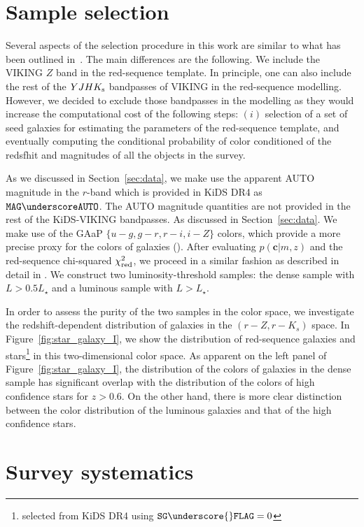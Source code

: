 \documentclass[fleqn,usenatbib,useAMS]{mnras}
\begin{document}
\section{Sample selection}\label{sec:selection}

Several aspects of the selection procedure in this work are similar to what has been outlined  in~\citet{vakili2019}.  The main differences are the following. We include the VIKING $Z$ band in the red-sequence template. In principle, one can also include the rest of the $YJHK_{\rm s}$ bandpasses of VIKING in the red-sequence modelling. However, we decided to exclude those bandpasses in the modelling as they would increase the computational cost of the following steps: $(i)$ selection of a set of seed galaxies for estimating the parameters of the red-sequence template, and eventually computing the conditional probability of color conditioned of the redsfhit and magnitudes of all the objects in the survey. 

As we discussed in Section~\ref{sec:data}, we make use the apparent AUTO magnitude in the $r$-band which is provided in KiDS DR4  as $\mathtt{MAG \underscore AUTO}$. The AUTO magnitude quantities are not provided in the rest of the KiDS-VIKING bandpasses. As discussed in Section~\ref{sec:data}. We make use of the GAaP $\{u-g,g-r,r-i,i-Z\}$ colors, which provide a more precise proxy for the colors of galaxies (\citealt{kuijken2019}). After evaluating $p(\boldsymbol{c}|m,z)$ and the red-sequence chi-squared $\chi^{2}_{\rm red}$, we proceed in a similar fashion as described in detail in \citet{rozo2016, vakili2019}. We construct two luminosity-threshold samples: the dense sample with $L>0.5 L_{\star}$ and a luminous sample with $L>L_{\star}$. 

In order to assess the purity of the two samples in the color space, we investigate the redshift-dependent distribution of galaxies in the $(r-Z, r-K_{s})$ space. In Figure~\ref{fig:star_galaxy_I}, we show the distribution of red-sequence galaxies and stars\footnote{selected from KiDS DR4 using $\mathtt{SG\underscore{}FLAG}= 0$} in this two-dimensional color space.  As apparent on the left panel of Figure~\ref{fig:star_galaxy_I}, the distribution of the colors of galaxies in the dense sample has significant overlap with the distribution of the colors of high confidence stars for $z>0.6$. On the other hand, there is more clear distinction between the color distribution of the luminous galaxies and that of the high confidence stars. 

\section{Survey systematics}\label{sec:systematic}
\end{document}
